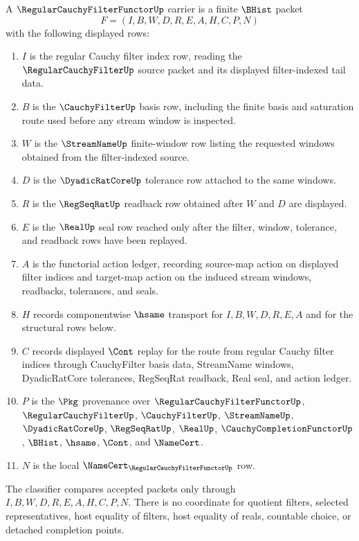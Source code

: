 \begin{definition}
\label{def:regular-cauchy-filter-functor-carrier}
A $\RegularCauchyFilterFunctorUp$ carrier is a finite $\BHist$ packet
$$
F=(I,B,W,D,R,E,A,H,C,P,N)
$$
with the following displayed rows:
\begin{enumerate}
\item $I$ is the regular Cauchy filter index row, reading the $\RegularCauchyFilterUp$ source packet and its displayed filter-indexed tail data.
\item $B$ is the $\CauchyFilterUp$ basis row, including the finite basis and saturation route used before any stream window is inspected.
\item $W$ is the $\StreamNameUp$ finite-window row listing the requested windows obtained from the filter-indexed source.
\item $D$ is the $\DyadicRatCoreUp$ tolerance row attached to the same windows.
\item $R$ is the $\RegSeqRatUp$ readback row obtained after $W$ and $D$ are displayed.
\item $E$ is the $\RealUp$ seal row reached only after the filter, window, tolerance, and readback rows have been replayed.
\item $A$ is the functorial action ledger, recording source-map action on displayed filter indices and target-map action on the induced stream windows, readbacks, tolerances, and seals.
\item $H$ records componentwise $\hsame$ transport for $I,B,W,D,R,E,A$ and for the structural rows below.
\item $C$ records displayed $\Cont$ replay for the route from regular Cauchy filter indices through CauchyFilter basis data, StreamName windows, DyadicRatCore tolerances, RegSeqRat readback, Real seal, and action ledger.
\item $P$ is the $\Pkg$ provenance over $\RegularCauchyFilterFunctorUp$, $\RegularCauchyFilterUp$, $\CauchyFilterUp$, $\StreamNameUp$, $\DyadicRatCoreUp$, $\RegSeqRatUp$, $\RealUp$, $\CauchyCompletionFunctorUp$, $\BHist$, $\hsame$, $\Cont$, and $\NameCert$.
\item $N$ is the local $\NameCert_{\RegularCauchyFilterFunctorUp}$ row.
\end{enumerate}
The classifier compares accepted packets only through $I,B,W,D,R,E,A,H,C,P,N$. There is no coordinate for quotient filters, selected representatives, host equality of filters, host equality of reals, countable choice, or detached completion points.
\end{definition}

